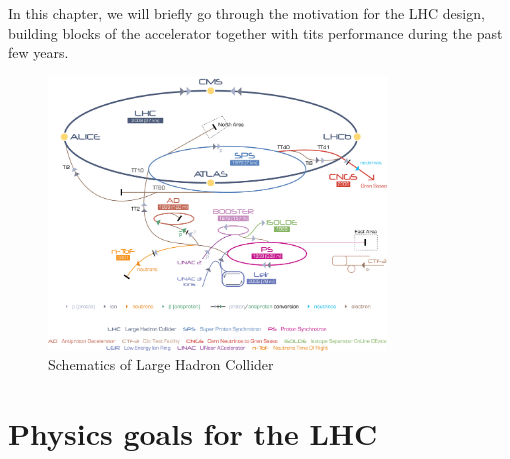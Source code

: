 In this chapter, we will briefly go through the motivation for the LHC design, building blocks of the accelerator together with tits performance during the past few years.   
\begin{figure}[htbp]
	\centering
		\includegraphics[width=0.8\textwidth]{Figures/LHC.jpg}
	\caption[Schematics of Large Hadron Collider]{Schematics of Large Hadron Collider}
	\label{fig:LHC}
\end{figure}

\section{Physics goals for the LHC}

